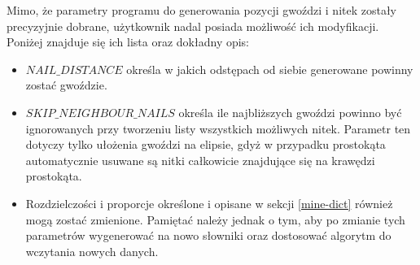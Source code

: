 \documentclass[a4paper, 12pt, polish, twoside]{extreport}
\begin{document}
    Mimo, że parametry programu do generowania pozycji gwoździ i nitek zostały precyzyjnie dobrane, użytkownik nadal posiada możliwość ich modyfikacji. Poniżej znajduje się ich lista oraz dokładny opis:
    \begin{itemize}
        \item \(NAIL\_DISTANCE\) określa w jakich odstępach od siebie generowane powinny zostać gwoździe.
        \item \(SKIP\_NEIGHBOUR\_NAILS\) określa ile najbliższych gwoździ powinno być ignorowanych przy tworzeniu listy wszystkich możliwych nitek. Parametr ten dotyczy tylko ułożenia gwoździ na elipsie, gdyż w przypadku prostokąta automatycznie usuwane są nitki całkowicie znajdujące się na krawędzi prostokąta.
        \item Rozdzielczości i proporcje określone i opisane w sekcji \ref{mine-dict} również mogą zostać zmienione. Pamiętać należy jednak o tym, aby po zmianie tych parametrów wygenerować na nowo słowniki oraz dostosować algorytm do wczytania nowych danych.
    \end{itemize}
    
\end{document}
